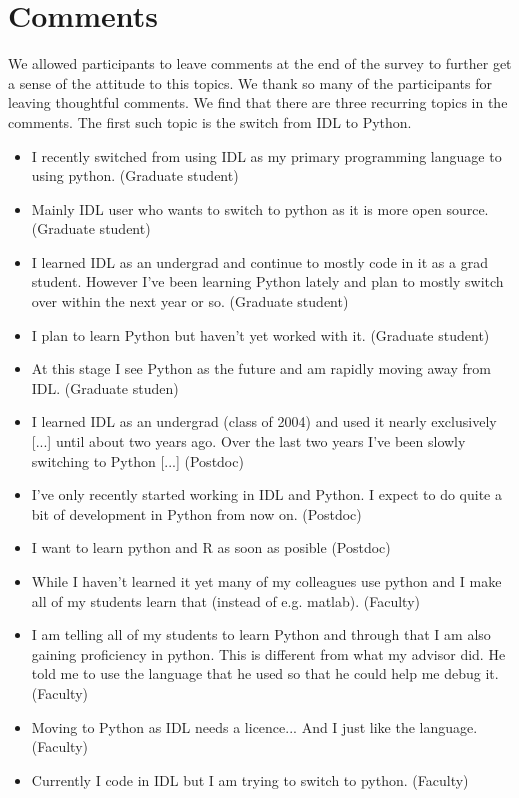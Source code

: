 \section{Comments}
\label{sec:comments}

We allowed participants to leave comments at the end of the survey to further get a sense of the attitude to this topics. We thank so many of the participants for leaving thoughtful comments. We find that there are three recurring topics in the comments. The first such topic is the switch from IDL to Python. 

\begin{itemize}
\item{I recently switched from using IDL as my primary programming language to using python. (Graduate student)}
\item{Mainly IDL user who wants to switch to python as it is more open source. (Graduate student)}
\item{I learned IDL as an undergrad and continue to mostly code in it as a grad student. However I've been learning Python lately and plan to mostly switch over within the next year or so. (Graduate student)}
\item{I plan to learn Python but haven't yet worked with it. (Graduate student)}
\item{At this stage I see Python as the future and am rapidly moving away from IDL. (Graduate studen)}
\item{I learned IDL as an undergrad (class of 2004) and used it nearly exclusively [...] until about two years ago. Over the last two years I've been slowly switching to Python [...]
(Postdoc)}
\item{I've only recently started working in IDL and Python.  I expect to do quite a bit of development in Python from now on. (Postdoc)}
\item{I want to learn python and R as soon as posible (Postdoc)}
\item{While I haven't learned it yet many of my colleagues use python and I make all of my students learn that (instead of e.g. matlab). (Faculty)}
\item{I am telling all of my students to learn Python and through that I am also gaining proficiency in python.  This is different from what my advisor did.  He told me to use the language that he used so that he could help me debug it. (Faculty)}
\item{Moving to Python as IDL needs a licence... And I just like the language. (Faculty)}
\item{Currently I code in IDL but I am trying to switch to python. (Faculty)}

\end{itemize}
